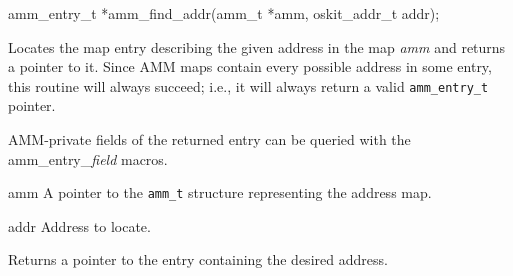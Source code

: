 \begin{apisyn}

	\funcproto amm_entry_t *amm_find_addr(amm_t *amm, oskit_addr_t addr);
\end{apisyn}
\begin{apidesc}
	Locates the map entry describing the given address in the map \emph{amm}
	and returns a pointer to it.
	Since AMM maps contain every possible address in some entry,
	this routine will always succeed; i.e., it will always return
	a valid {\tt amm_entry_t} pointer.

	AMM-private fields of the returned entry can be queried with the
	amm_entry_\emph{field} macros.
\end{apidesc}
\begin{apiparm}
	\item[amm]
		A pointer to the {\tt amm_t} structure
		representing the address map.
	\item[addr]
		Address to locate.
\end{apiparm}
\begin{apiret}
	Returns a pointer to the entry containing the desired address.
\end{apiret}


